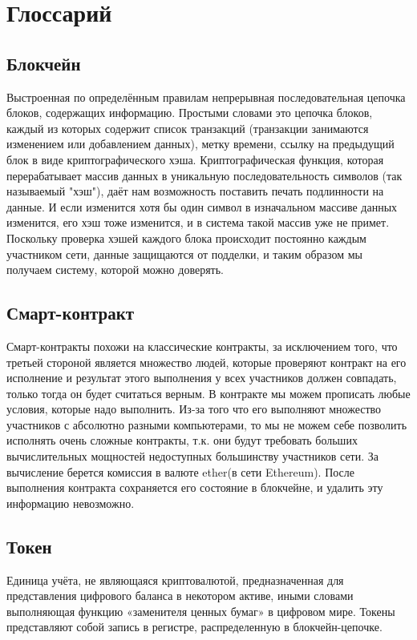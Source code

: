 \documentclass[a4paper,12pt]{report}
\begin{document}
\chapter{Глоссарий}

\section{Блокчейн}
Выстроенная по определённым правилам непрерывная последовательная цепочка блоков, содержащих информацию. Простыми словами это цепочка блоков, каждый из которых содержит список транзакций (транзакции занимаются изменением или добавлением данных), метку времени, ссылку на предыдущий блок в виде криптографического хэша. Криптографическая функция, которая перерабатывает массив данных в уникальную последовательность символов (так называемый "хэш"), даёт нам возможность поставить печать подлинности на данные. И если изменится хотя бы один символ в изначальном массиве данных изменится, его хэш тоже изменится, и в система такой массив уже не примет. Поскольку проверка хэшей каждого блока происходит постоянно каждым участником сети, данные защищаются от подделки, и таким образом мы получаем систему, которой можно доверять.


\section{Смарт-контракт}
Смарт-контракты похожи на классические контракты, за исключением того, что третьей стороной является множество людей, которые проверяют контракт на его исполнение и результат этого выполнения у всех участников должен совпадать, только тогда он будет считаться верным. В контракте мы можем прописать любые условия, которые надо выполнить. Из-за того что его выполняют множество участников с абсолютно разными компьютерами, то мы не можем себе позволить исполнять очень сложные контракты, т.к. они будут требовать больших вычислительных мощностей недоступных большинству участников сети. За вычисление берется комиссия в валюте ether(в сети Ethereum). После выполнения контракта сохраняется его состояние в блокчейне,
и удалить эту информацию невозможно.

\section{Токен}
Единица учёта, не являющаяся криптовалютой, предназначенная для представления цифрового баланса в некотором активе, иными словами выполняющая функцию «заменителя ценных бумаг» в цифровом мире. Токены представляют собой запись в регистре, распределенную в блокчейн-цепочке.
\end{document}
